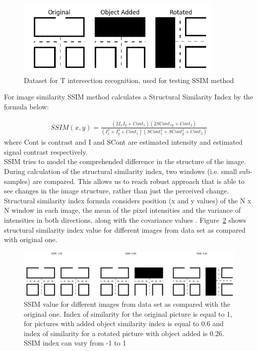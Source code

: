 \begin{figure}[H]
	\centering  	
	\includegraphics[width=10cm]{img/DB.png}
	\caption{Dataset for T intersection recognition, used for testing \gls{SSIM} method}
	\label{fig:db}    
\end{figure}

For image similarity \gls{SSIM} method calculates a Structural Similarity Index by the formula below:

\begin{equation}
\begin{split}
SSIM(x,y) = \displaystyle \frac{(2I_{x}I_{y} + Cont_{1})(2SCont_{xy} + Cont_{2})}{(I_{x}^2 + I_{y}^2 + Cont_{1})(SCont_{x}^2 + SCont_{y}^2 + Cont_{2})}
\end{split}
\label{eqn:SSI}
\end{equation}
where Cont is contrast and I and SCont are estimated intensity and estimated signal contrast respectively. \\
\gls{SSIM} tries to model the comprehended difference in the structure of the image. During calculation of the structural similarity index, two windows (i.e. small sub-samples) are compared. This allows us to reach robust approach that is able to see changes in the image structure, rather than just the perceived change. Structural similarity index formula considers position (x and y values) of the N x N window in each image, the mean of the pixel intensities and the variance of intensities in both directions, along with the covariance values \cite{SSIMII}. Figure~\ref{fig:res} shows structural similarity index value for different images from data set as compared with original one.

\begin{figure}[H]
	\centering  	
	\includegraphics[width=14cm]{img/results.png}
	\caption{\gls{SSIM} value for different images from data set as compared with the original one. Index of similarity for the original picture is equal to 1, for pictures with added object similarity index is equal to 0.6 and index of similarity for a rotated picture with object added is 0.26. SSIM index can vary from -1 to 1}
	\label{fig:res}    
\end{figure}

